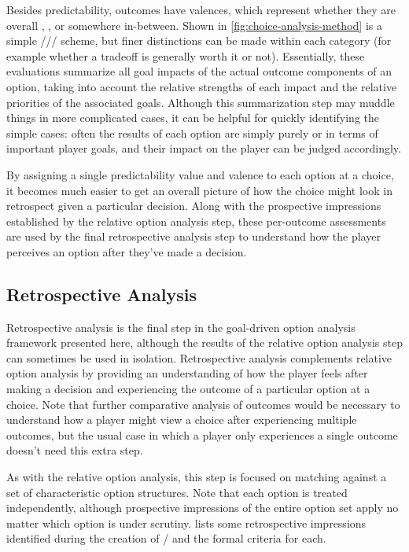 Besides predictability, outcomes have valences, which represent whether they are overall , , or somewhere in-between.
%
Shown in \cref{fig:choice-analysis-method} is a simple /// scheme, but finer distinctions can be made within each category (for example whether a tradeoff is generally worth it or not).
%
Essentially, these evaluations summarize all goal impacts of the actual outcome components of an option, taking into account the relative strengths of each impact and the relative priorities of the associated goals.
%
Although this summarization step may muddle things in more complicated cases, it can be helpful for quickly identifying the simple cases: often the results of each option are simply purely  or  in terms of important player goals, and their impact on the player can be judged accordingly.


By assigning a single predictability value and valence to each option at a choice, it becomes much easier to get an overall picture of how the choice might look in retrospect given a particular decision.
%
Along with the prospective impressions established by the relative option analysis step, these per-outcome assessments are used by the final retrospective analysis step to understand how the player perceives an option after they've made a decision.


\subsection{Retrospective Analysis}

\label{sec:cp-retrospective-analysis}


Retrospective analysis is the final step in the goal-driven option analysis framework presented here, although the results of the relative option analysis step can sometimes be used in isolation.
%
Retrospective analysis complements relative option analysis by providing an understanding of how the player feels after making a decision and experiencing the outcome of a particular option at a choice.
%
Note that further comparative analysis of outcomes would be necessary to understand how a player might view a choice after experiencing multiple outcomes, but the usual case in which a player only experiences a single outcome doesn't need this extra step.


As with the relative option analysis, this step is focused on matching against a set of characteristic option structures.
%
Note that each option is treated independently, although prospective impressions of the entire option set apply no matter which option is under scrutiny.
%
 lists some retrospective impressions identified during the creation of \dunyazad/ and the formal criteria for each.


